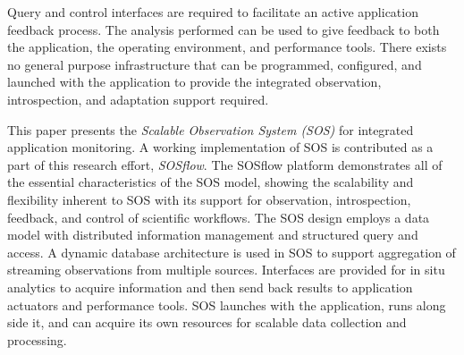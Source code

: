 %
Query and control interfaces are required to facilitate
an active application feedback process.
%
The analysis performed can be used to give feedback to both the
application, the operating environment, and performance tools.
%
There exists no general purpose infrastructure that can be programmed,
configured, and launched with the application to provide the
integrated observation, introspection, and adaptation support
required.
%
\par
%
This paper presents the \textit{Scalable Observation System (SOS)} for
integrated application monitoring.
%
A working implementation of SOS is contributed as a part of this
research effort, \textit{SOSflow}.
%
The SOSflow platform demonstrates all of the essential characteristics
of the SOS model, showing the scalability and flexibility inherent to
SOS with its support for observation, introspection, feedback, and
control of scientific workflows.
%
The SOS design employs a data model with distributed
information management and structured query and access.
%
A dynamic database architecture is used in SOS to support aggregation
of streaming observations from multiple sources.
%
%
Interfaces are provided for in situ analytics to acquire
information and then send back results to application actuators
and performance tools.
%
SOS launches with the application, runs along side it, and can acquire
its own resources for scalable data collection and processing.
%
%

